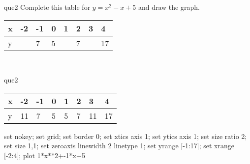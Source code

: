 \documentclass[13.5pt, varwidth=true]{beamer}
\begin{document}
\begin{frame}[shrink=19,fragile]
	\begin{beamercolorbox}[rounded=true, left, shadow=true,wd=14.8cm]{que2}
		 Complete this table for $y = x^{2} - x + 5$ and draw the graph. \\[0.3cm] \renewcommand{\arraystretch}{1.2}\begin{tabular}{|C|C|C|C|C|C|C|C|} \hline x & -2 & -1 & 0 & 1 & 2 & 3 & 4 \\ \hline y &  & 7 & 5 &  & 7 &  & 17\\ \hline \end{tabular}\\[0.3cm]
	\end{beamercolorbox}
\end{frame}
\begin{frame}[shrink=19,fragile]
	\begin{beamercolorbox}[rounded=true, left, shadow=true,wd=14.8cm]{que2}
		\renewcommand{\arraystretch}{1.2}\begin{tabular}{|C|C|C|C|C|C|C|C|} \hline x & -2 & -1 & 0 & 1 & 2 & 3 & 4 \\ \hline y & 11 & 7 & 5 & 5 & 7 & 11 & 17\\ \hline \end{tabular}\begin{gnuplot}[terminal=pdf] set nokey; set grid; set border 0; set xtics axis 1; set ytics axis 1; set size ratio 2; set size 1,1; set zeroaxis linewidth 2 linetype 1; set yrange [-1:17]; set xrange [-2:4]; plot 1*x**2+-1*x+5 \end{gnuplot}
	\end{beamercolorbox}
\end{frame}
\end{document}
